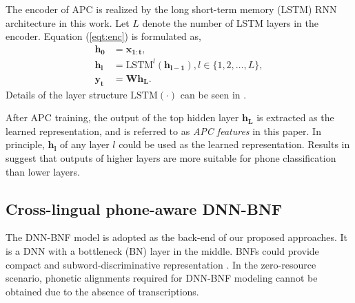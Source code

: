 \documentclass[a4paper]{article}
\begin{document}
The encoder of APC is realized by the long short-term memory (LSTM) \cite{hochreiter1997long} RNN architecture in this work. Let $L$ denote the number of LSTM layers in the encoder. Equation (\ref{eqt:enc}) is formulated as,
\begin{align}
    \bm{h_0} &= \bm{x_{1:t}},    \\
    \bm{h_l} &= \textrm{LSTM}^l (\bm{h_{l-1}}), l\in \{1,2,\ldots, L\}, \\
    \bm{y_t} &= \bm{W} \bm{h_L}.
\end{align}
Details of the  layer structure $\textrm{LSTM} (\cdot)$ can be seen in \cite{sak2014long}.

After APC training, the output of the top hidden layer $\bm{h_L}$ is extracted as the  learned  representation, and is referred to as \textit{APC features} in this paper. In principle,  $\bm{h_l}$ of any layer $l$ could be used as the learned representation. Results in \cite{Chung2019} suggest that outputs of higher layers  are more suitable for phone classification than lower layers.

\subsection{Cross-lingual phone-aware DNN-BNF}
The DNN-BNF model  \cite{chen2017multilingual,feng2018exploiting} is adopted as the back-end of our proposed approaches. It is a DNN with a bottleneck (BN) layer in the middle. BNFs could provide compact and subword-discriminative representation  \cite{grezl2009investigation}.  
In the zero-resource scenario, phonetic alignments  required for DNN-BNF modeling cannot be obtained due to the absence of transcriptions. 
\end{document}
